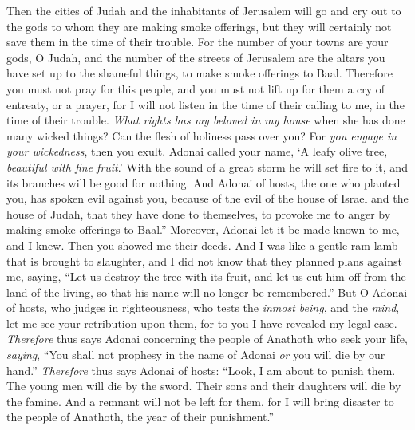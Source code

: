 \begin{biblechapter}
\verse Then the cities of Judah and the inhabitants of Jerusalem will go and cry out to the gods to whom they are making smoke offerings, but they will certainly not save them in the time of their trouble.
\verse For the number of your towns are your gods, O Judah, and the number of the streets of Jerusalem are the altars you have set up to the shameful things, to make smoke offerings to Baal.
\verse Therefore you must not pray for this people, and you must not lift up for them a cry of entreaty, or a prayer, for I will not listen in the time of their calling to me, in the time of their trouble.
\verse \textit{What rights has my beloved in my house} 
when she has done many wicked things? 
Can the flesh of holiness pass over you? 
For \textit{you engage in your wickedness}, then you exult.
\verse Adonai called your name, ‘A leafy olive tree, \textit{beautiful with fine fruit}.’ 
With the sound of a great storm he will set fire to it, 
and its branches will be good for nothing.
\verse And Adonai of hosts, the one who planted you, 
has spoken evil against you, 
because of the evil of the house of Israel and the house of Judah, 
that they have done to themselves, 
to provoke me to anger by making smoke offerings to Baal.”
 Moreover, Adonai let it be made known to me, and I knew. 
Then you showed me their deeds.
\verse And I was like a gentle ram-lamb that is brought to slaughter, 
and I did not know that they planned plans against me, saying, 
“Let us destroy the tree with its fruit, 
and let us cut him off from the land of the living, 
so that his name will no longer be remembered.”
\verse But O Adonai of hosts, who judges in righteousness, 
who tests the \textit{inmost being}, and the \textit{mind}, 
let me see your retribution upon them, 
for to you I have revealed my legal case.
\verse \textit{Therefore} thus says Adonai concerning the people of Anathoth who seek your life, \textit{saying}, “You shall not prophesy in the name of Adonai \textit{or} you will die by our hand.”
\verse \textit{Therefore} thus says Adonai of hosts: “Look, I am about to punish them. The young men will die by the sword. Their sons and their daughters will die by the famine.
\verse And a remnant will not be left for them, for I will bring disaster to the people of Anathoth, the year of their punishment.”
\end{biblechapter}

